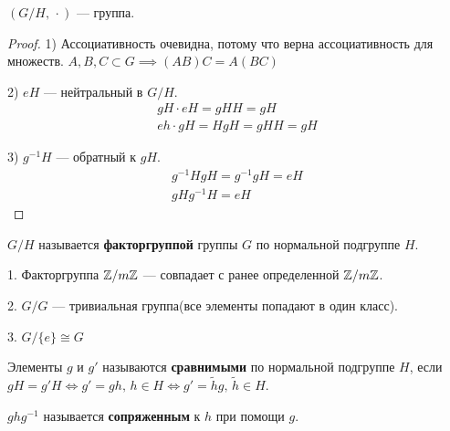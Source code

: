 \documentclass[../main.tex]{subfiles}
\begin{document}
\begin{theorem-non}
    $(G / H, \, \cdot)$ --- группа.
\end{theorem-non}
\begin{proof}
    1) Ассоциативность очевидна, потому что верна ассоциативность для множеств. $A, B, C \subset G \implies (AB)C = A(BC)$

    2) $eH$ --- нейтральный в $G / H$.
    \begin{equation*}
        \begin{gathered}
            gH \cdot eH = gHH = gH\\
            eh \cdot gH = HgH = gHH = gH
        \end{gathered}
    \end{equation*}

    3) $g^{-1}H$ --- обратный к $gH$.
    \begin{equation*}
        \begin{gathered}
            g^{-1}HgH = g^{-1}gH = eH \\
            gHg^{-1}H = eH
        \end{gathered}
    \end{equation*}
\end{proof}
\begin{definition}
    $G / H$ называется \textbf{факторгруппой} группы $G$ по нормальной подгруппе $H$.
\end{definition}

\begin{theorem-non}
    1. Факторгруппа $\mathbb{Z}/m\mathbb{Z}$ --- совпадает с ранее определенной $\mathbb{Z}/m\mathbb{Z}$.

    2. $G / G$ --- тривиальная группа(все элементы попадают в один класс).

    3. $G / \{e\} \cong G$
\end{theorem-non}

\begin{definition}
    Элементы $g$ и $g'$ называются \textbf{сравнимыми} по нормальной подгруппе $H$, если \linebreak
    $gH = g'H \iff g' = gh, \, h \in H \iff g' = \tilde{h}g, \, \tilde{h} \in H$.
\end{definition}

\begin{definition}
    $ghg^{-1}$ называется \textbf{сопряженным} к $h$ при помощи $g$.
\end{definition}
\end{document}
